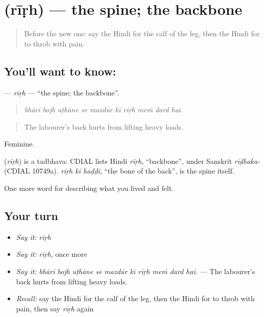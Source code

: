 \section[\texorpdfstring{\hi{रीढ़} (rīṛh)}{रीढ़ (rīṛh)}]{ (rīṛh) — the spine; the backbone}

\label{lesson:HI-C486-rirh}



\begin{quote}
Before the new one: say the Hindi for the calf of the leg, then the Hindi for to throb with pain.
\end{quote}

\subsection*{You'll want to know: }
\textbf{} — \emph{rīṛh} — \textquotedblleft{}the spine; the backbone\textquotedblright{}.

\begin{quote}
         
\end{quote}

\begin{quote}
\emph{bhārī bojh uṭhāne se mazdūr kī rīṛh meṁ dard hai.}
\end{quote}

\begin{quote}
The labourer's back hurts from lifting heavy loads.
\end{quote}

Feminine.

\begin{cousinweb}
\textbf{} (\emph{rīṛh}) is a tadbhava: CDIAL lists Hindi \emph{rīṛh}, \textquotedblleft{}backbone\textquotedblright{}, under Sanskrit \emph{rīḍhaka-} (CDIAL 10749a). \emph{rīṛh kī haḍḍī}, \textquotedblleft{}the bone of the back\textquotedblright{}, is the spine itself.
\end{cousinweb}

\begin{grammarlens}[title={What you've built}]
One more word for describing what you lived and felt.
\end{grammarlens}

\subsection*{Your turn}
\begin{itemize}
\raggedright
  \item \emph{Say it:} \emph{rīṛh}
  \item \emph{Say it:} \emph{rīṛh}, once more
  \item \emph{Say it:} \emph{bhārī bojh uṭhāne se mazdūr kī rīṛh meṁ dard hai.} — The labourer's back hurts from lifting heavy loads.
  \item \emph{Recall:} say the Hindi for the calf of the leg, then the Hindi for to throb with pain, then say \emph{rīṛh} again
\end{itemize}

